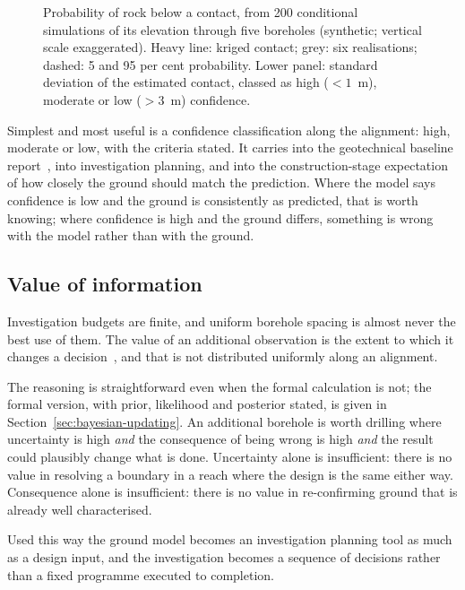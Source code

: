 \begin{figure}[htbp]
\centering
{}
\caption{Probability of rock below a contact, from 200 conditional simulations of its elevation through five boreholes (synthetic; vertical scale exaggerated). Heavy line: kriged contact; grey: six realisations; dashed: 5 and 95 per cent probability. Lower panel: standard deviation of the estimated contact, classed as high ($<1$~m), moderate or low ($>3$~m) confidence.}
\label{fig:contact-probability}
\end{figure}

Simplest and most useful is a confidence classification along the alignment:
high, moderate or low, with the criteria stated. It carries into the
geotechnical baseline report~\citep{essex2007gbr}, into investigation
planning, and into the
construction-stage expectation of how closely the ground should match the
prediction. Where the model says confidence is low and the ground is
consistently as predicted, that is worth knowing; where confidence is high and
the ground differs, something is wrong with the model rather than with the
ground.

\subsection{Value of information}
\label{sec:value-of-information}

Investigation budgets are finite, and uniform borehole spacing is almost never
the best use of them. The value of an additional observation is the extent to
which it changes a decision~\citep{baecher2003reliability}, and that is not
distributed uniformly along an alignment.

The reasoning is straightforward even when the formal calculation is not; the
formal version, with prior, likelihood and posterior stated, is given in
Section~\ref{sec:bayesian-updating}. An
additional borehole is worth drilling where uncertainty is high \emph{and} the
consequence of being wrong is high \emph{and} the result could plausibly
change what is done. Uncertainty alone is insufficient: there is no value in
resolving a boundary in a reach where the design is the same either way.
Consequence alone is insufficient: there is no value in re-confirming ground
that is already well characterised.

Used this way the ground model becomes an investigation planning tool as much
as a design input, and the investigation becomes a sequence of decisions
rather than a fixed programme executed to completion.

